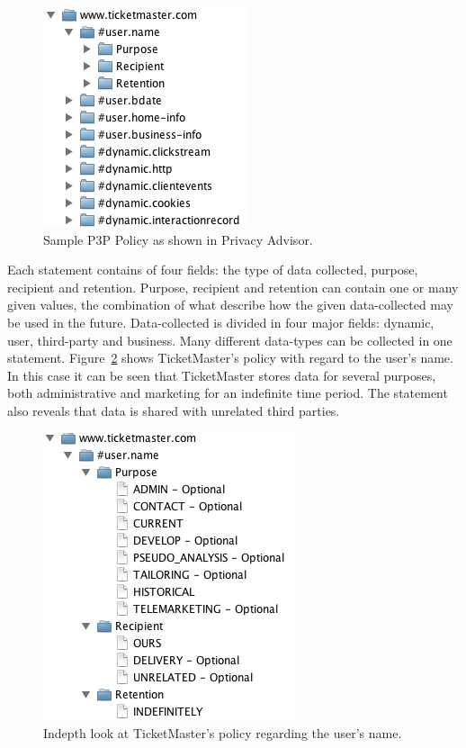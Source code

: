 \begin{figure}[htbp]
\begin{center}
\includegraphics{Implementation/p3p_pol}
\caption{Sample P3P Policy as shown in Privacy Advisor.}
\label{p3pPol}
\end{center}
\end{figure}

Each statement contains of four fields: the type of data collected, purpose, recipient and retention. Purpose, recipient and retention can contain one or many given values, the combination of what describe how the given data-collected may be used in the future. Data-collected is divided in four major fields: dynamic, user, third-party and business. Many different data-types can be collected in one statement. Figure~\ref{p3pNameField} shows TicketMaster's policy with regard to the user's name. In this case it can be seen that TicketMaster stores data for several purposes, both administrative and marketing for an indefinite time period. The statement also reveals that data is shared with unrelated third parties.

\begin{figure}[htbp]
\begin{center}
\includegraphics{Implementation/p3p_fields}
\caption{Indepth look at TicketMaster's policy regarding the user's name.}
\label{p3pNameField}
\end{center}
\end{figure}


